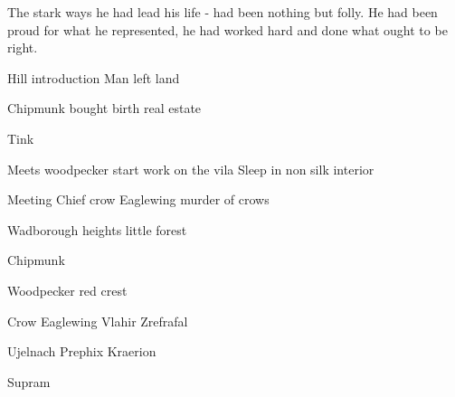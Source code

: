 \documentclass[smalldemyvopaper,11pt,twoside,onecolumn,openright,extrafontsizes]{memoir}
\begin{document}
The stark ways he had lead his life - had been nothing but folly. He had been proud for what he represented, he had worked hard and done what ought to be right. 

\newpage

\vspace*{4.3cm}
\begin{localsize}{10}
	\begin{quote}
	\end{quote} 
\end{localsize}
\vspace{1cm}

\newpage
 Hill introduction Man left land

 Chipmunk bought birth real estate
 
 Tink

 Meets woodpecker start work on the vila
 Sleep in non silk interior

Meeting Chief crow Eaglewing murder of crows

Wadborough heights little forest 

Chipmunk 

Woodpecker 
red crest

Crow Eaglewing
Vlahir
Zrefrafal

Ujelnach
Prephix
Kraerion

Supram

\end{document}
